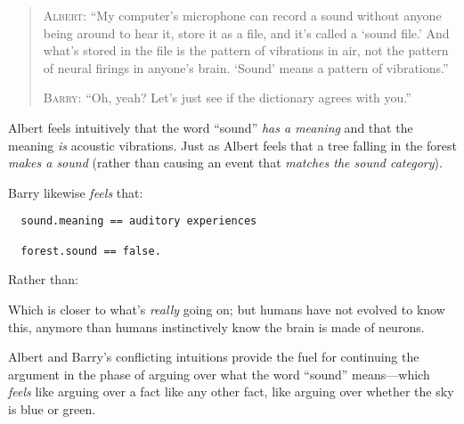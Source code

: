 \begin{quotation}
{
 \textsc{Albert}: ``My computer's
microphone can record a sound without anyone being around to hear it,
store it as a file, and it's called a
`sound file.' And what's
stored in the file is the pattern of vibrations in air, not the pattern
of neural firings in anyone's brain.
`Sound' means a pattern of
vibrations.''}

{
 \textsc{Barry}: ``Oh, yeah? Let's just see
 if the dictionary agrees with you.''}
\end{quotation}

{
 Albert feels intuitively that the word
``sound'' \textit{has a meaning} and
that the meaning \textit{is} acoustic vibrations. Just as Albert feels
that a tree falling in the forest \textit{makes a sound} (rather than
causing an event that \textit{matches the sound category}).}

{
 Barry likewise \textit{feels} that:}

\begin{verbatim}
  sound.meaning == auditory experiences

  forest.sound == false.
\end{verbatim}

{
 Rather than:}


{
 Which is closer to what's \textit{really} going
on; but humans have not evolved to know this, anymore than humans
instinctively know the brain is made of neurons.}

{
 Albert and Barry's conflicting intuitions provide
the fuel for continuing the argument in the phase of arguing over what
the word ``sound'' means---which
\textit{feels} like arguing over a fact like any other fact, like
arguing over whether the sky is blue or green.}

